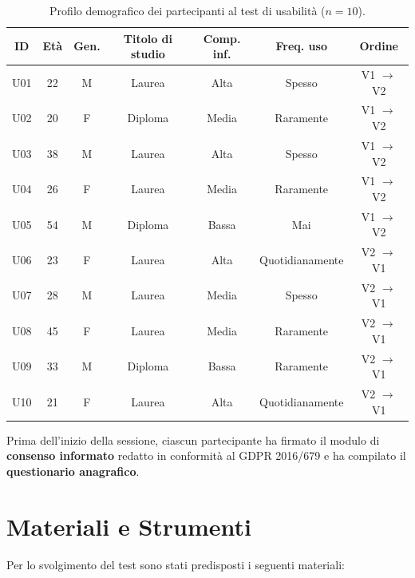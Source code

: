 \begin{table}[H]
\centering
\renewcommand{\arraystretch}{1.4}
\small
\begin{tabular}{|c|c|c|c|c|c|c|}
\hline
\textbf{ID} & \textbf{Età} & \textbf{Gen.} & \textbf{Titolo di studio} & \textbf{Comp. inf.} & \textbf{Freq. uso} & \textbf{Ordine} \\
\hline
U01 & 22 & M & Laurea      & Alta  & Spesso          & V1 $\to$ V2 \\ \hline
U02 & 20 & F & Diploma     & Media & Raramente       & V1 $\to$ V2 \\ \hline
U03 & 38 & M & Laurea      & Alta  & Spesso          & V1 $\to$ V2 \\ \hline
U04 & 26 & F & Laurea      & Media & Raramente       & V1 $\to$ V2 \\ \hline
U05 & 54 & M & Diploma     & Bassa & Mai             & V1 $\to$ V2 \\ \hline
U06 & 23 & F & Laurea      & Alta  & Quotidianamente & V2 $\to$ V1 \\ \hline
U07 & 28 & M & Laurea      & Media & Spesso          & V2 $\to$ V1 \\ \hline
U08 & 45 & F & Laurea      & Media & Raramente       & V2 $\to$ V1 \\ \hline
U09 & 33 & M & Diploma     & Bassa & Raramente       & V2 $\to$ V1 \\ \hline
U10 & 21 & F & Laurea      & Alta  & Quotidianamente & V2 $\to$ V1 \\ \hline
\end{tabular}
\caption{Profilo demografico dei partecipanti al test di usabilità ($n=10$).}
\label{tab:partecipanti}
\end{table}

Prima dell'inizio della sessione, ciascun partecipante ha firmato il modulo di \textbf{consenso informato} redatto in conformità al GDPR 2016/679 e ha compilato il \textbf{questionario anagrafico}.

\section{Materiali e Strumenti}

Per lo svolgimento del test sono stati predisposti i seguenti materiali:

